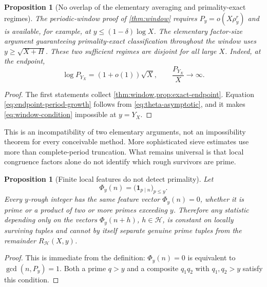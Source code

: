 \documentclass[11pt]{article}
\newtheorem{proposition}[theorem]{Proposition}
\theoremstyle{definition}
\theoremstyle{remark}
\newcommand{\cH}{\mathcal H}
\newcommand{\one}{\mathbf 1}
\begin{document}
\begin{proposition}[No overlap of the elementary averaging and primality-exact regimes]\label{prop:scale-mismatch}
The periodic-window proof of \cref{thm:window} requires
$P_y=o(X\rho_y^r)$ and is available, for example, at $y\le(1-\delta)\log X$.  The elementary factor-size argument guaranteeing primality-exact classification throughout the window uses $y\ge\sqrt{X+H}$.  These two sufficient regimes are disjoint for all large $X$.  Indeed, at the endpoint,
\begin{equation}\label{eq:endpoint-period-growth}
    \log P_{Y_X}=(1+o(1))\sqrt X,
    \qquad
    \frac{P_{Y_X}}X\longrightarrow\infty.
\end{equation}
\end{proposition}

\begin{proof}
The first statements collect \cref{thm:window,prop:exact-endpoint}.  Equation \eqref{eq:endpoint-period-growth} follows from \eqref{eq:theta-asymptotic}, and it makes \eqref{eq:window-condition} impossible at $y=Y_X$.
\end{proof}

This is an incompatibility of two elementary arguments, not an impossibility theorem for every conceivable method.  More sophisticated sieve estimates use more than complete-period truncation.  What remains universal is that local congruence factors alone do not identify which rough survivors are prime.

\begin{proposition}[Finite local features do not detect primality]\label{prop:finite-features}
Let
\begin{equation}\label{eq:local-feature-map}
    \Phi_y(n)=\bigl(\one_{p\mid n}\bigr)_{p\le y}.
\end{equation}
Every $y$-rough integer has the same feature vector $\Phi_y(n)=0$, whether it is prime or a product of two or more primes exceeding $y$.  Therefore any statistic depending only on the vectors
$\Phi_y(n+h)$, $h\in\cH$, is constant on locally surviving tuples and cannot by itself separate genuine prime tuples from the remainder $R_{\cH}(X,y)$.
\end{proposition}

\begin{proof}
This is immediate from the definition: $\Phi_y(n)=0$ is equivalent to $\gcd(n,P_y)=1$.  Both a prime $q>y$ and a composite $q_1q_2$ with $q_1,q_2>y$ satisfy this condition.
\end{proof}
\end{document}
